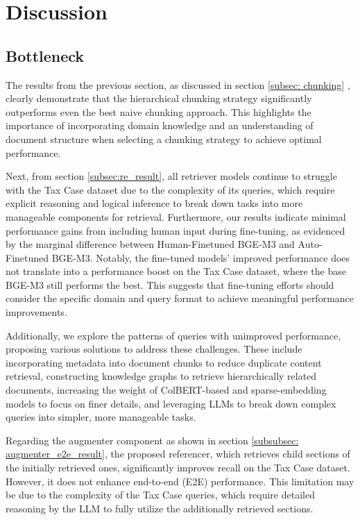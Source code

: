 \section{Discussion}

\subsection{Bottleneck}
\label{subsubsec: bottleneck}
The results from the previous section, as discussed in section \ref{subsec: chunking} , clearly demonstrate that the hierarchical chunking strategy significantly outperforms even the best naive chunking approach. This highlights the importance of incorporating domain knowledge and an understanding of document structure when selecting a chunking strategy to achieve optimal performance.

Next, from section \ref{subsec:re_result}, all retriever models continue to struggle with the Tax Case dataset due to the complexity of its queries, which require explicit reasoning and logical inference to break down tasks into more manageable components for retrieval. Furthermore, our results indicate minimal performance gains from including human input during fine-tuning, as evidenced by the marginal difference between Human-Finetuned BGE-M3 and Auto-Finetuned BGE-M3. Notably, the fine-tuned models' improved performance does not translate into a performance boost on the Tax Case dataset, where the base BGE-M3 still performs the best. This suggests that fine-tuning efforts should consider the specific domain and query format to achieve meaningful performance improvements.

Additionally, we explore the patterns of queries with unimproved performance, proposing various solutions to address these challenges. These include incorporating metadata into document chunks to reduce duplicate content retrieval, constructing knowledge graphs to retrieve hierarchically related documents, increasing the weight of ColBERT-based and sparse-embedding models to focus on finer details, and leveraging LLMs to break down complex queries into simpler, more manageable tasks.

Regarding the augmenter component as shown in section \ref{subsubsec: augmenter_e2e_result}, the proposed referencer, which retrieves child sections of the initially retrieved ones, significantly improves recall on the Tax Case dataset. However, it does not enhance end-to-end (E2E) performance. This limitation may be due to the complexity of the Tax Case queries, which require detailed reasoning by the LLM to fully utilize the additionally retrieved sections.

